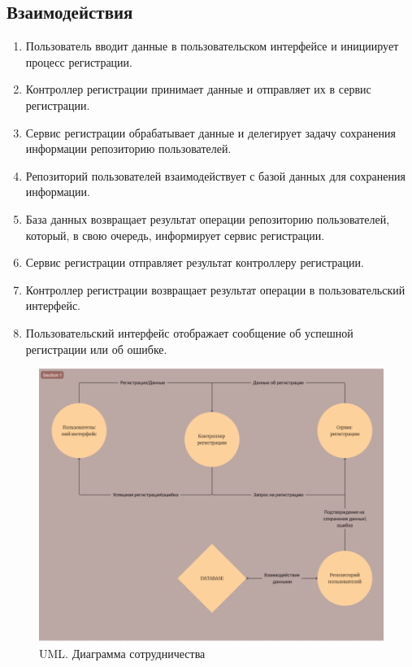 \documentclass[a4paper,12pt]{article}
\begin{document}
\subsection{Взаимодействия}
\begin{enumerate}
    \item Пользователь вводит данные в пользовательском интерфейсе и инициирует процесс регистрации.
    \item Контроллер регистрации принимает данные и отправляет их в сервис регистрации.
    \item Сервис регистрации обрабатывает данные и делегирует задачу сохранения информации репозиторию пользователей.
    \item Репозиторий пользователей взаимодействует с базой данных для сохранения информации.
    \item База данных возвращает результат операции репозиторию пользователей, который, в свою очередь, информирует сервис регистрации.
    \item Сервис регистрации отправляет результат контроллеру регистрации.
    \item Контроллер регистрации возвращает результат операции в пользовательский интерфейс.
    \item Пользовательский интерфейс отображает сообщение об успешной регистрации или об ошибке.
\end{enumerate}

\begin{figure}[-h]
    \centering
    \includegraphics[width=1\linewidth]{UML_Sotr.png}
    \caption{UML. Диаграмма сотрудничества}
\end{figure}
\end{document}
